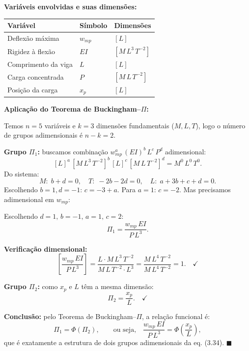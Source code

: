 \textbf{Variáveis envolvidas e suas dimensões:}

\begin{center}
\begin{tabular}{lll}
\hline
Variável & Símbolo & Dimensões \\
\hline
Deflexão máxima & $w_{mp}$ & $[L]$ \\
Rigidez à flexão & $EI$ & $[M\,L^3\,T^{-2}]$ \\
Comprimento da viga & $L$ & $[L]$ \\
Carga concentrada & $P$ & $[M\,L\,T^{-2}]$ \\
Posição da carga & $x_p$ & $[L]$ \\
\hline
\end{tabular}
\end{center}

\textbf{Aplicação do Teorema de Buckingham--$\Pi$:}

Temos $n=5$ variáveis e $k=3$ dimensões fundamentais ($M,L,T$), logo o número de grupos adimensionais é $n-k=2$.

\textbf{Grupo $\Pi_1$:} buscamos combinação $w_{mp}^a\,(EI)^b\,L^c\,P^d$ adimensional:
\[
[L]^a\,[M\,L^3\,T^{-2}]^b\,[L]^c\,[M\,L\,T^{-2}]^d=M^0\,L^0\,T^0.
\]
Do sistema:
\[
M:\;b+d=0,\quad T:\;-2b-2d=0,\quad L:\;a+3b+c+d=0.
\]
Escolhendo $b=1,d=-1$: $c=-3+a$. Para $a=1$: $c=-2$. Mas precisamos adimensional em $w_{mp}$:

Escolhendo $d=1,\,b=-1,\,a=1,\,c=2$:
\[
\Pi_1 = \frac{w_{mp}\,EI}{P\,L^3}.
\]

\textbf{Verificação dimensional:}
\[
\left[\frac{w_{mp}\,EI}{P\,L^3}\right]=\frac{L\cdot M\,L^3\,T^{-2}}{M\,L\,T^{-2}\cdot L^3}=\frac{M\,L^4\,T^{-2}}{M\,L^4\,T^{-2}}=1.\quad\checkmark
\]

\textbf{Grupo $\Pi_2$:} como $x_p$ e $L$ têm a mesma dimensão:
\[
\Pi_2 = \frac{x_p}{L}.\quad\checkmark
\]

\textbf{Conclusão:} pelo Teorema de Buckingham--$\Pi$, a relação funcional é:
\[
\Pi_1 = \Phi(\Pi_2),\qquad\text{ou seja,}\quad\frac{w_{mp}\,EI}{P\,L^3}=\Phi\!\left(\frac{x_p}{L}\right),
\]
que é exatamente a estrutura de dois grupos adimensionais da eq. (3.34). $\blacksquare$

